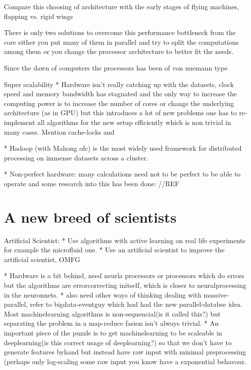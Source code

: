 \documentclass{article}
\begin{document}
    Compare this choosing of architecture with the early stages of flying
    machines, flapping vs. rigid wings
    
    There is only two solutions to overcome this performance bottleneck from the
    core either you put many of them in parallel and try to split the
    computations among them or you change the processor architecture to better
    fit the needs.


    Since the dawn of computers the processors has been of von nuemann type


    Super scalability
    * Hardware isn't really catching up with the datasets, clock speed and
    memory bandwidth has
    stagnated and the only way to increase the computing power is to increase
    the number of cores or change the underlying architecture (as in GPU) but 
    this introduces a lot of new problems one has to re-implement all
    algorithms for the new setup efficiently which is non trivial in many
    cases. Mention cache-locks and

    * Hadoop (with Mahong ofc) is the most widely used framework for
    distributed processing on immense datasets across a cluster. 

    * Non-perfect hardware: many calculations need not to be perfect to be able
    to operate and some research into this has been done: //REF

\section{A new breed of scientists}
    Artificial Scientist: 
    * Use algorithms with active learning on real life experiments for example the
    microfluid one.
    * Use an artificial scientist to improve the artificial scientist, OMFG

    * Hardware is a bit  behind, need neurla processors or processors which do
    errors but the algorithms are errorcorrecting initself, which is closer to
    neuralprocessing in the neuronnets.
    * also need other ways of thinking dealing with massive-parallel, refer to
    bigdata-eventguy which had had the new parallel-databse idea. Most
    machinelearning algorithms is non-sequencial(is it called this?) but separating
    the problem in a map-reduce fasion isn't always trivial.
    * An important piece of the puzzle is to get machinelearning to be scaleable in
    deeplearning(is this correct usage of deeplearning?) so that we don't have to
    generate features byhand but instead have raw input with minimal preprocessing
    (perhaps only log-scaling some raw input you know have a exponential behavour.
\end{document}
